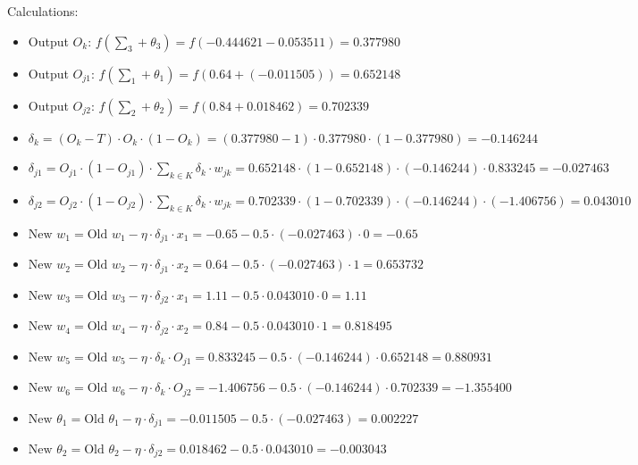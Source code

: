 \documentclass{book}
\begin{document}
Calculations:\\
\begin{itemize}
    \item Output \(O_{k}\): \(f(\sum_3 + \theta_3) = f(-0.444621 - 0.053511) = 0.377980\)
    \item Output \(O_{j1}\): \(f(\sum_1 + \theta_1) = f(0.64 + (-0.011505)) = 0.652148\)
    \item Output \(O_{j2}\): \(f(\sum_2 + \theta_2) = f(0.84 + 0.018462) = 0.702339\)
    \item \(\delta_k = (O_k - T) \cdot O_k \cdot (1 - O_k) = (0.377980 - 1) \cdot 0.377980 \cdot (1 - 0.377980) = -0.146244\)
    \item \(\delta_{j1} = O_{j1} \cdot (1 - O_{j1}) \cdot \sum_{k \in K} \delta_k \cdot w_{jk} = 0.652148 \cdot (1 - 0.652148) \cdot (-0.146244) \cdot 0.833245 = -0.027463\)
    \item \(\delta_{j2} = O_{j2} \cdot (1 - O_{j2}) \cdot \sum_{k \in K} \delta_k \cdot w_{jk} = 0.702339 \cdot (1 - 0.702339) \cdot (-0.146244) \cdot (-1.406756) = 0.043010\)
    \item \(\text{New } w_1 = \text{Old } w_1 - \eta \cdot \delta_{j1} \cdot x_1 = -0.65 - 0.5 \cdot (-0.027463) \cdot 0 = -0.65\)
    \item \(\text{New } w_2 = \text{Old } w_2 - \eta \cdot \delta_{j1} \cdot x_2 = 0.64 - 0.5 \cdot (-0.027463) \cdot 1 = 0.653732\)
    \item \(\text{New } w_3 = \text{Old } w_3 - \eta \cdot \delta_{j2} \cdot x_1 = 1.11 - 0.5 \cdot 0.043010 \cdot 0 = 1.11\)
    \item \(\text{New } w_4 = \text{Old } w_4 - \eta \cdot \delta_{j2} \cdot x_2 = 0.84 - 0.5 \cdot 0.043010 \cdot 1 = 0.818495\)
    \item \(\text{New } w_5 = \text{Old } w_5 - \eta \cdot \delta_k \cdot O_{j1} = 0.833245 - 0.5 \cdot (-0.146244) \cdot 0.652148 = 0.880931\)
    \item \(\text{New } w_6 = \text{Old } w_6 - \eta \cdot \delta_k \cdot O_{j2} = -1.406756 - 0.5 \cdot (-0.146244) \cdot 0.702339 = -1.355400\)
    \item \(\text{New } \theta_1 = \text{Old } \theta_1 - \eta \cdot \delta_{j1} = -0.011505 - 0.5 \cdot (-0.027463) = 0.002227\)
    \item \(\text{New } \theta_2 = \text{Old } \theta_2 - \eta \cdot \delta_{j2} = 0.018462 - 0.5 \cdot 0.043010 = -0.003043\)
\end{itemize}
\end{document}
